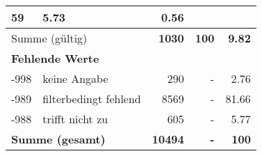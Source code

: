 \begin{longtable}{lXrrr}
       \num{59} &
       \num[round-mode=places,round-precision=2]{5.73} &
         \num[round-mode=places,round-precision=2]{0.56} \\
     \midrule
     \multicolumn{2}{l}{Summe (gültig)} &
       \textbf{\num{1030}} &
     \textbf{\num{100}} &
       \textbf{\num[round-mode=places,round-precision=2]{9.82}} \\
     \multicolumn{5}{l}{\textbf{Fehlende Werte}}\\
       -998 &
       keine Angabe &
         \num{290} &
        - &
         \num[round-mode=places,round-precision=2]{2.76} \\
       -989 &
       filterbedingt fehlend &
         \num{8569} &
        - &
         \num[round-mode=places,round-precision=2]{81.66} \\
       -988 &
       trifft nicht zu &
         \num{605} &
        - &
         \num[round-mode=places,round-precision=2]{5.77} \\
     \midrule
     \multicolumn{2}{l}{\textbf{Summe (gesamt)}} &
          \textbf{\num{10494}} &
        \textbf{-} &
        \textbf{\num{100}} \\
     \bottomrule
     \end{longtable}
     
